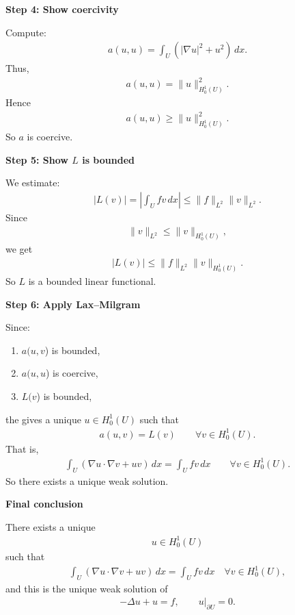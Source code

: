\documentclass[12pt,a4paper]{report}
\begin{document}
\begin{description}
\begin{description}
\item \textbf{Step 4: Show coercivity}

Compute:
\begin{align*}
a(u,u)=\int_U (|\nabla u|^2+u^2)\,dx.
\end{align*}
Thus,
\begin{align*}
a(u,u)=\|u\|_{H_0^1(U)}^2.
\end{align*}
Hence
\begin{align*}
a(u,u)\ge \|u\|_{H_0^1(U)}^2.
\end{align*}
So $a$ is coercive.

\item \textbf{Step 5: Show $L$ is bounded}

We estimate:
\begin{align*}
|L(v)| = \left|\int_U fv\,dx\right| \le \|f\|_{L^2}\|v\|_{L^2}.
\end{align*}
Since
\begin{align*}
\|v\|_{L^2}\le \|v\|_{H_0^1(U)},
\end{align*}
we get
\begin{align*}
|L(v)| \le
\|f\|_{L^2}\|v\|_{H_0^1(U)}.
\end{align*}
So $L$ is a bounded linear functional.

\item \textbf{Step 6: Apply Lax–Milgram}

Since:

\begin{enumerate}
\item $a(u,v$) is bounded,
\item $a(u,u$) is coercive,
\item $L(v$) is bounded,
\end{enumerate}

the  gives a unique $u\in H_0^1(U)$ such that
\begin{align*}
a(u,v)=L(v) \qquad\forall v\in H_0^1(U).
\end{align*}
That is,
\begin{align*}
\int_U (\nabla u\cdot\nabla v+uv)\,dx = \int_U fv\,dx \qquad\forall v\in H_0^1(U).
\end{align*}
So there exists a unique weak solution.

\item \textbf{Final conclusion}

There exists a unique
\begin{align*}
u\in H_0^1(U)
\end{align*}
such that
\begin{align*}
\boxed{
\int_U (\nabla u\cdot\nabla v+uv)\,dx = \int_U fv\,dx \quad\forall v\in H_0^1(U),
}
\end{align*}
and this is the unique weak solution of
\begin{align*}
-\Delta u+u=f,\qquad u|_{\partial U}=0.
\end{align*}


\end{description}
\end{description}
\end{document}
